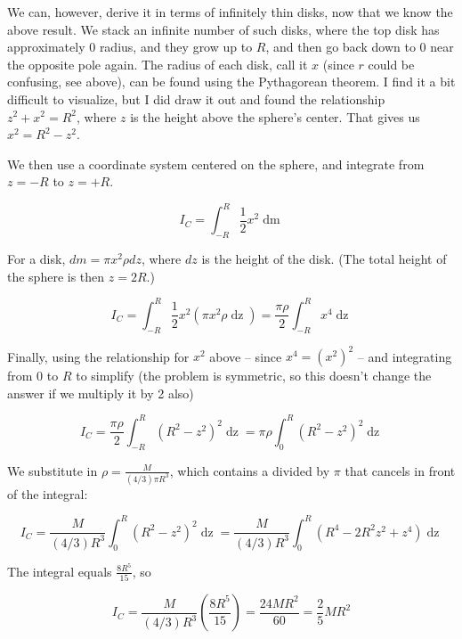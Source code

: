 \documentclass[12pt,a4paper]{report}
\begin{document}
We can, however, derive it in terms of infinitely thin disks, now that we know the  above result. We stack an infinite number of such disks, where the top disk has approximately 0 radius, and they grow up to $R$, and then go back down to 0 near the opposite pole again. The radius of each disk, call it $x$ (since $r$ could be confusing, see above), can be found using the Pythagorean theorem. I find it a bit difficult to visualize, but I did draw it out and found the relationship $z^2 + x^2 = R^2$, where $z$ is the height above the sphere's center. That gives us $x^2 = R^2 - z^2$.

We then use a coordinate system centered on the sphere, and integrate from $z = -R$ to $z = +R$.

\begin{equation}
I_C = \int_{-R}^{R} \frac{1}{2} x^2 \mathop{dm}
\end{equation}

For a disk, $dm = \pi x^2 \rho dz$, where $dz$ is the height of the disk. (The total height of the sphere is then $z = 2R$.)

\begin{equation}
I_C = \int_{-R}^{R} \frac{1}{2} x^2 (\pi x^2 \rho \mathop{dz}) = \frac{\pi \rho}{2} \int_{-R}^{R} x^4 \mathop{dz}
\end{equation}

Finally, using the relationship for $x^2$ above -- since $x^4 = (x^2)^2$ -- and integrating from $0$ to $R$ to simplify (the problem is symmetric, so this doesn't change the answer if we multiply it by 2 also)

\begin{equation}
I_C = \frac{\pi \rho}{2} \int_{-R}^{R} (R^2 - z^2)^2 \mathop{dz} = \pi \rho \int_{0}^{R} (R^2 - z^2)^2 \mathop{dz}
\end{equation}

We substitute in $\displaystyle \rho = \frac{M}{(4/3) \pi R^3}$, which contains a divided by $\pi$ that cancels in front of the integral:

\begin{equation}
I_C = \frac{M}{(4/3) R^3} \int_{0}^{R} (R^2 - z^2)^2 \mathop{dz} = \frac{M}{(4/3) R^3} \int_{0}^{R} \left(R^4 - 2 R^2 z^2 + z^4 \right)\mathop{dz}
\end{equation}

The integral equals $\displaystyle \frac{8 R^5}{15}$, so

\begin{equation}
I_C = \frac{M}{(4/3) R^3} \left(\frac{8 R^5}{15}\right) = \frac{24 M R^2}{60} = \frac{2}{5} M R^2
\end{equation}
\end{document}
